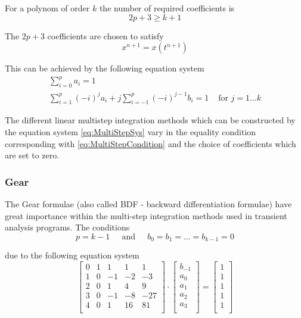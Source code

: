 For a polynom of order $k$ the number of required coefficients is
\begin{equation}
\label{eq:MultiStepCondition}
2p + 3 \ge k + 1
\end{equation}

The $2p +3$ coefficients are chosen to satisfy
\begin{equation}
x^{n+1} = x(t^{n+1})
\end{equation}

This can be achieved by the following equation system
\begin{equation}
\begin{split}
\label{eq:MultiStepSys}
\sum^p_{i=0} a_i = 1\\
\sum^p_{i=1} (-i)^j a_i + j \sum^p_{i=-1} (-i)^{j-1} b_i = 1 & \textrm{ for } j = 1\ldots k
\end{split}
\end{equation}

The different linear multistep integration methods which can be
constructed by the equation system \eqref{eq:MultiStepSys} vary in the
equality condition corresponding with \eqref{eq:MultiStepCondition}
and the choice of coefficients which are set to zero.

\subsubsection{Gear}

The Gear \cite{Gear} formulae (also called BDF - backward
differentiation formulae) have great importance within the multi-step
integration methods used in transient analysis programs.  The
conditions
\begin{equation}
p = k - 1
\;\;\;\; \textrm{ and } \;\;\;\;
b_0 = b_1 = \ldots = b_{k-1} = 0
\end{equation}

due to the following equation system
\begin{equation}
\label{eq:GearCoeff}
\left[\begin{array}{lrrrr}
0 & 1 &  1 &  1 &   1\\
1 & 0 & -1 & -2 &  -3\\
2 & 0 &  1 &  4 &   9\\
3 & 0 & -1 & -8 & -27\\
4 & 0 &  1 & 16 &  81\\
\end{array}\right]
\cdot
\begin{bmatrix}
b_{-1}\\
a_0\\
a_1\\
a_2\\
a_3\\
\end{bmatrix}
=
\begin{bmatrix}
1\\
1\\
1\\
1\\
1\\
\end{bmatrix}
\end{equation}

